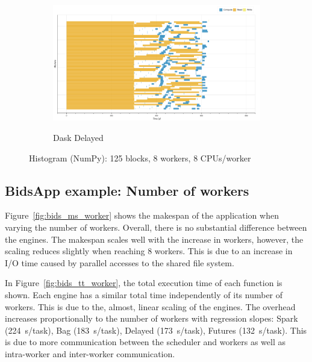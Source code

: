 \documentclass[conference]{IEEEtran}
\begin{document}
\begin{figure}[!tb]
\begin{subfigure}[b]{\columnwidth}
{        \includegraphics[clip,width=\columnwidth,
        height=0.15\textheight]{images/delayed_histo_np_gantt.png}}
        \caption{Dask Delayed}\label{fig:histo_np_dask_delayed_gantt}
    \end{subfigure}
    \caption{Histogram (NumPy): 125 blocks, 8 workers, 8
    CPUs/worker}\label{fig:histo_np_gantt}
\end{figure}

\subsection{BidsApp example: Number of workers}
Figure~\ref{fig:bids_ms_worker} shows the makespan of the application when
varying the number of workers. Overall, there is no substantial difference
between the engines. The makespan scales well with the increase in workers,
however, the scaling reduces slightly when reaching 8 workers. This is due
to an increase in I/O time caused by parallel accesses to 
the shared file system.

In Figure~\ref{fig:bids_tt_worker}, the total execution time of each function is
shown. Each engine has a similar total time independently of its number of workers.
This is due to the, almost, linear scaling of the engines. The overhead increases
proportionally to the number of workers with regression slopes: Spark
(\SI{224}{\second/task}), Bag (\SI{183}{\second/task}), Delayed
(\SI{173}{\second/task}), Futures (\SI{132}{\second/task}). This is due to more
communication between the scheduler and workers as well as intra-worker and
inter-worker communication.
\end{document}
